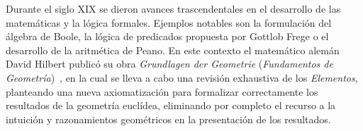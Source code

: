 Durante el siglo XIX se dieron avances trascendentales en el desarrollo de las
matemáticas y la lógica formales. Ejemplos notables son la formulación del
álgebra de Boole, la lógica de predicados propuesta por Gottlob Frege o el
desarrollo de la aritmética de Peano. En este contexto el matemático alemán
David Hilbert publicó su obra \textit{Grundlagen der Geometrie}
(\textit{Fundamentos de Geometría})~\cite{hilbertFoundationsGeometry1950}, en la
cual se lleva a cabo una revisión exhaustiva de los \textit{Elementos},
planteando una nueva axiomatización para formalizar correctamente los resultados
de la geometría euclídea, eliminando por completo el recurso a la intuición y
razonamientos geométricos en la presentación de los resultados.









